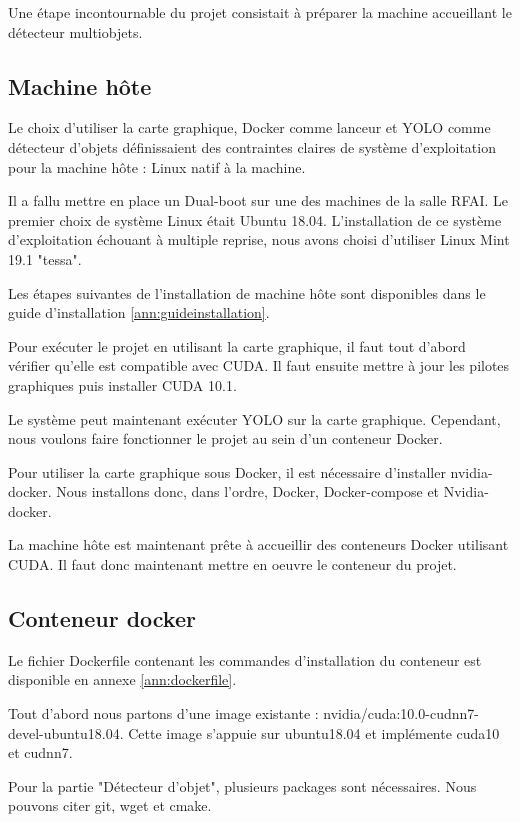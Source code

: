 \documentclass[debug,nodate,hideweeklyreports]{polytech/polytech}
\begin{document}
Une étape incontournable du projet consistait à préparer la machine accueillant le détecteur multiobjets.

\subsection{Machine hôte}

Le choix d'utiliser la carte graphique, Docker comme lanceur et YOLO comme détecteur d'objets définissaient des contraintes claires de système d'exploitation pour la machine hôte : Linux natif à la machine.

Il a fallu mettre en place un Dual-boot sur une des machines de la salle RFAI. Le premier choix de système Linux était Ubuntu 18.04. L'installation de ce système d'exploitation échouant à multiple reprise, nous avons choisi d'utiliser Linux Mint 19.1 "tessa".

Les étapes suivantes de l'installation de machine hôte sont disponibles dans le guide d'installation \autoref{ann:guideinstallation}.

Pour exécuter le projet en utilisant la carte graphique, il faut tout d'abord vérifier qu'elle est compatible avec CUDA. Il faut ensuite mettre à jour les pilotes graphiques puis installer CUDA 10.1.

Le système peut maintenant exécuter YOLO sur la carte graphique.
Cependant, nous voulons faire fonctionner le projet au sein d'un conteneur Docker.

Pour utiliser la carte graphique sous Docker, il est nécessaire d'installer nvidia-docker. Nous installons donc, dans l'ordre, Docker, Docker-compose et Nvidia-docker.

La machine hôte est maintenant prête à accueillir des conteneurs Docker utilisant CUDA. Il faut donc maintenant mettre en oeuvre le conteneur du projet.

\subsection{Conteneur docker}

Le fichier Dockerfile contenant les commandes d'installation du conteneur est disponible en annexe \autoref{ann:dockerfile}.

Tout d'abord nous partons d'une image existante : nvidia/cuda:10.0-cudnn7-devel-ubuntu18.04. Cette image s'appuie sur ubuntu18.04 et implémente cuda10 et cudnn7.

Pour la partie "Détecteur d'objet", plusieurs packages sont nécessaires. Nous pouvons citer git, wget et cmake.
\end{document}

